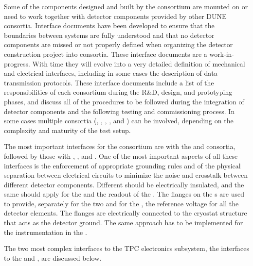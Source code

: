 Some of the components designed and built by the  consortium are
mounted on or need to work together with detector components provided by other DUNE
consortia. Interface documents have been developed to ensure that the boundaries
between systems are fully understood and that no detector components are missed or
not properly defined when organizing the detector construction project into
consortia. These interface documents are a work-in-progress. With time they will
evolve into a very detailed definition of mechanical and electrical interfaces,
including in some cases the description of data transmission protocols. These
interface documents include a list of the responsibilities of each consortium during the
R\&D, design, and prototyping phases, and discuss all of the procedures to be
followed during the integration of detector components and the following testing
and commissioning process. In some cases multiple consortia (, , , ,
and ) %
can be involved, depending on the complexity and maturity of the test setup.

The most important interfaces for the  consortium are with the  and 
consortia, followed by those with , , and . One of the most
important aspects of all these interfaces is the enforcement of appropriate grounding rules
and of the physical separation between electrical circuits to minimize the noise and
crosstalk between different detector components. Different  should be electrically
insulated, and the same should apply for the  and the
 readout of the . The flanges on the \fdth{}s are used to provide,
separately for the two  and for the , the reference
voltage for all the detector elements. The flanges are electrically connected
to the cryostat structure that acts as the detector ground. The same approach
has to be implemented for the  instrumentation in the \lar.

The two most complex interfaces to the TPC electronics subsystem, the
interfaces to the  and , are discussed below.

